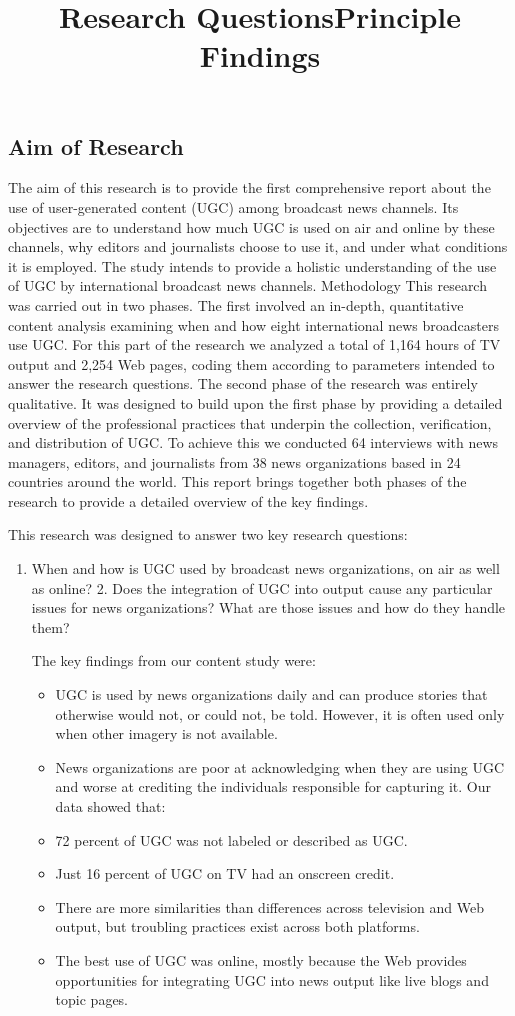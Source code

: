 \documentclass[symmetric, notoc, nobib]{towcenter-book}
\begin{document}
\subsection{Aim of Research}
The aim of this research is to provide the first comprehensive report about the use of user-generated content (UGC) among broadcast news channels. Its objectives are to understand how much UGC is used on air and online by these channels, why editors and journalists choose to use it, and under what conditions it is employed. The study intends to provide a holistic understanding of the use of UGC by international broadcast news channels.
Methodology
This research was carried out in two phases. The first involved an in-depth, quantitative content analysis examining when and how eight international news broadcasters use UGC. For this part of the research we analyzed a total of 1,164 hours of TV output and 2,254 Web pages, coding them according to parameters intended to answer the research questions. The second phase of the research was entirely qualitative. It was designed to build upon the first phase by providing a detailed overview of the professional practices that underpin the collection, verification, and distribution of UGC. To achieve this we conducted 64 interviews with news managers, editors, and journalists from 38 news organizations based in 24 countries around the world. This report brings together both phases of the research to provide a detailed overview of the key findings.

\title{Research Questions}
This research was designed to answer two key research questions: 
\begin{enumerate}
\item When and how is UGC used by broadcast news organizations,
on air as well as online?
2. Does the integration of UGC into output cause any particular
issues for news organizations? What are those issues and how do
they handle them?
\title{Principle Findings}
The key findings from our content study were:
\begin{itemize}
\item UGC is used by news organizations daily and can produce stories
that otherwise would not, or could not, be told. However, it
is often used only when other imagery is not available.
\item News organizations are poor at acknowledging when they are
using UGC and worse at crediting the individuals responsible for
capturing it. Our data showed that:
\item 72 percent of UGC was not labeled or described as UGC.
\item Just 16 percent of UGC on TV had an onscreen credit.
\item There are more similarities than differences across television and
Web output, but troubling practices exist across both platforms.
\item The best use of UGC was online, mostly because the Web provides
opportunities for integrating UGC into news output like
live blogs and topic pages.
\end{itemize}
\end{enumerate}
\end{document}
